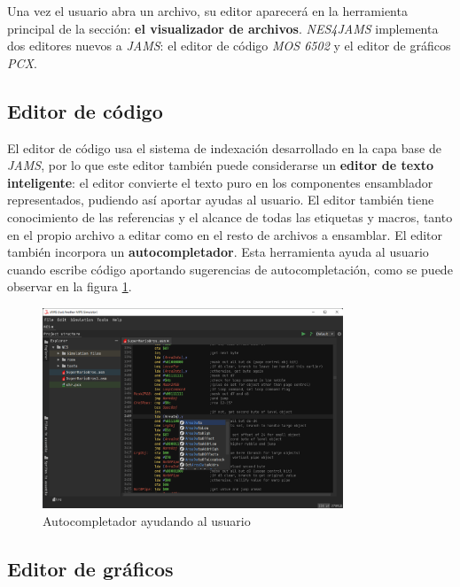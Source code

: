 Una vez el usuario abra un archivo, su editor aparecerá en la herramienta
principal de la sección: \textbf{el visualizador de archivos}.
\textit{NES4JAMS} implementa dos editores nuevos a \textit{JAMS}:
el editor de código \textit{MOS 6502} y el editor de gráficos \textit{PCX}.

\subsection{Editor de código}\label{subsec:editor-de-codigo}

El editor de código usa el sistema de indexación desarrollado
en la capa base de \textit{JAMS}, por lo que este editor también
puede considerarse un \textbf{editor de texto inteligente}:
el editor convierte el texto puro en los componentes ensamblador
representados, pudiendo así aportar ayudas al usuario.
El editor también tiene conocimiento de las referencias y el alcance de
todas las etiquetas y macros, tanto en el propio archivo a editar
como en el resto de archivos a ensamblar.
El editor también incorpora un \textbf{autocompletador}.
Esta herramienta ayuda al usuario cuando escribe código
aportando sugerencias de autocompletación, como se puede
observar en la figura \ref{fig:nes-autocompletion}.

\begin{figure}[h]
    \centering
    \includegraphics[width=0.8\textwidth]{images/nes/nes-autocompletion}
    \caption{Autocompletador ayudando al usuario}
    \label{fig:nes-autocompletion}
\end{figure}

\subsection{Editor de gráficos}\label{subsec:editor-de-graficos}

